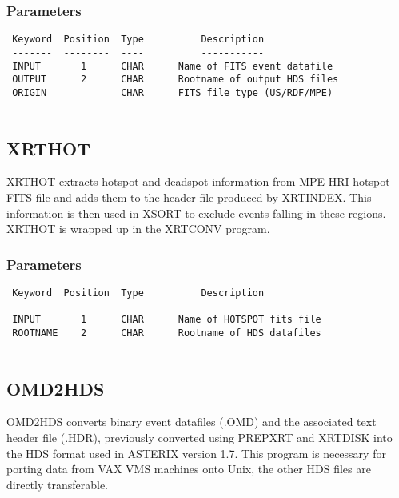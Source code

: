 \documentclass{book}
\renewcommand{\_}{{\tt\char'137}}     %
\begin{document}
\subsubsection{Parameters}
\begin{verbatim}
 Keyword  Position  Type          Description
 -------  --------  ----          -----------
 INPUT       1      CHAR      Name of FITS event datafile
 OUTPUT      2      CHAR      Rootname of output HDS files
 ORIGIN             CHAR      FITS file type (US/RDF/MPE)
 
\end{verbatim}\subsection{XRTHOT}
XRTHOT extracts hotspot and deadspot information from MPE HRI hotspot
FITS file and adds them to the header file produced by XRTINDEX. This
information is then used in XSORT to exclude events falling in these
regions. XRTHOT is wrapped up in the XRTCONV program.
 
\subsubsection{Parameters}
\begin{verbatim}
 Keyword  Position  Type          Description
 -------  --------  ----          -----------
 INPUT       1      CHAR      Name of HOTSPOT fits file
 ROOTNAME    2      CHAR      Rootname of HDS datafiles
 
\end{verbatim}\subsection{OMD2HDS}
OMD2HDS converts binary event datafiles (.OMD) and the associated text
header file (.HDR), previously converted using PREPXRT and XRTDISK into
the HDS format used in ASTERIX version 1.7. This program is necessary
for porting data from VAX VMS machines onto Unix, the other HDS files
are directly transferable.
 
\end{document}
